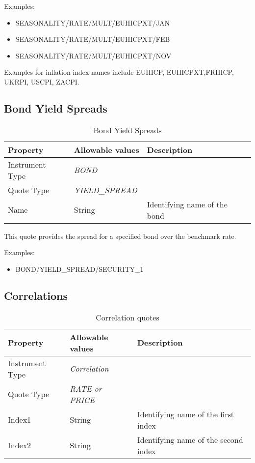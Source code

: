 \medskip
Examples:
\begin{itemize}
\item SEASONALITY/RATE/MULT/EUHICPXT/JAN
\item SEASONALITY/RATE/MULT/EUHICPXT/FEB
\item SEASONALITY/RATE/MULT/EUHICPXT/NOV
\end{itemize}

Examples for inflation index names include EUHICP, EUHICPXT,FRHICP, UKRPI, USCPI, ZACPI.

\subsection{Bond Yield Spreads}

\begin{table}[H]
\centering
  \begin{tabular}{|p{3cm}|p{3.5cm}|p{7cm}|}
  \hline
  {\bf Property} & {\bf Allowable values} & {\bf Description} \\ \hline
    Instrument Type & \emph{BOND} & \\ \hline
    Quote Type & \emph{YIELD\_SPREAD} & \\ \hline
    Name & String & Identifying name of the bond \\ \hline
  \end{tabular}
  \caption{Bond Yield Spreads}
  \label{tab:bondyieldspread_quote}
\end{table}

This quote provides the spread for a specified bond over the benchmark rate.

\medskip
Examples:
\begin{itemize}
	\item BOND/YIELD\_SPREAD/SECURITY\_1
\end{itemize}

\subsection{Correlations}

\begin{table}[H]
\centering
  \begin{tabular}{|p{3cm}|p{3.5cm}|p{7cm}|}
  \hline
  {\bf Property} & {\bf Allowable values} & {\bf Description} \\ \hline
    Instrument Type & \emph{Correlation} & \\ \hline
    Quote Type & \emph{RATE or PRICE} & \\ \hline
    Index1 & String & Identifying name of the first index \\ \hline
    Index2 & String & Identifying name of the second index \\ \hline
  \end{tabular}
  \caption{Correlation quotes}
  \label{tab:correlation_quote}
\end{table}

